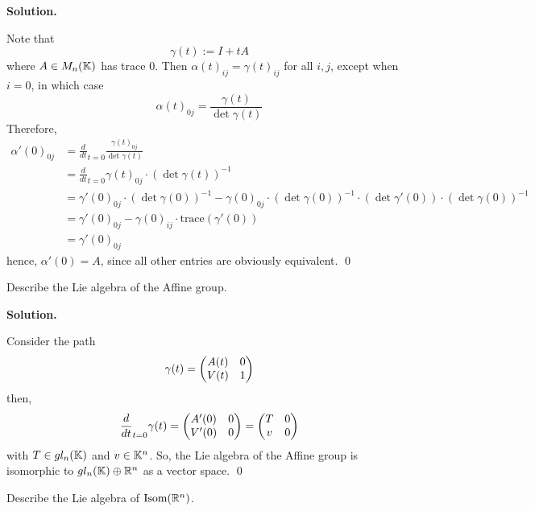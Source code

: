 \documentclass[12pt]{book}
\theoremstyle{definition}
\newenvironment{solution}
{%
  \par\noindent\textbf{Solution.}\quad
}
{%
  \qed\par
}
\begin{document}
\begin{solution}
  Note that 
  \[\gamma(t) := I +tA\]
  where $A \in M_n(\mathbb{K})$ has trace $0$.
  Then $\alpha(t)_{ij} = \gamma(t)_{ij}$ for all $i,j$, except when $i = 0$, in which case
  \[\alpha(t)_{0j} = \frac{\gamma(t)}{\det \gamma(t)}\]
  Therefore, 
  \[
  \begin{aligned}
    \alpha'(0)_{0j} &= \frac{d}{dt}_{t=0} \frac{\gamma(t)_{0j}}{\det \gamma(t)} \\
                    &= \frac{d}{dt}_{t=0} \gamma(t)_{0j} \cdot (\det \gamma(t))^{-1} \\
                    &= \gamma'(0)_{0j} \cdot (\det \gamma(0))^{-1} - \gamma(0)_{0j}\cdot (\det \gamma(0))^{-1} \cdot (\det \gamma'(0)) \cdot (\det \gamma(0))^{-1} \\
                    &= \gamma'(0)_{0j} - \gamma(0)_{ij}\cdot \text{trace} (\gamma '(0)) \\
                    &= \gamma'(0)_{0j}
  \end{aligned}
  \]
  hence, $\alpha '(0) = A$, since all other entries are obviously equivalent.
\end{solution}

\begin{taggedexercise}[\textcolor{red}{TODO}]

\end{taggedexercise}

\begin{taggedexercise}[\textcolor{red}{TODO}]

\end{taggedexercise}


\begin{taggedexercise}[\textcolor{green}{Complete}]
Describe the Lie algebra of the Affine group.
\end{taggedexercise}

\begin{solution}
  Consider the path 
  \[
  \gamma(t) = \begin{pmatrix} A(t) & 0 \\ V(t) & 1 \end{pmatrix}
  \]
  then,
  \[
  \frac{d}{dt}_{t=0} \gamma(t) = \begin{pmatrix} A'(0) & 0 \\ V'(0) & 0 \end{pmatrix} = \begin{pmatrix} T & 0 \\ v & 0 \end{pmatrix}
  \]
  with $T \in gl_n(\mathbb{K})$ and $v \in \mathbb{K}^n$.
  So, the Lie algebra of the Affine group is isomorphic to $gl_n(\mathbb{K}) \oplus \mathbb{R}^n$ as a vector space.
\end{solution}

\begin{taggedexercise}[\textcolor{green}{Complete}]
Describe the Lie algebra of $\text{Isom}(\mathbb{R}^n)$.
\end{taggedexercise}
\end{document}
